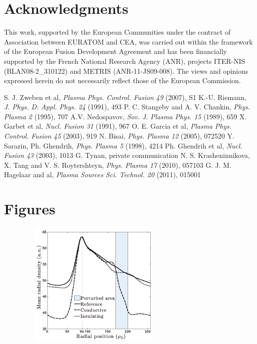 \documentclass[a4paper,12pt]{article} %
\begin{document}
\section*{Acknowledgments}
This work, supported by the European Communities under the contract of
Association between EURATOM and CEA, was carried out within the
framework of the European Fusion Development Agreement and has been financially supported by the French National Research 
Agency (ANR), projects ITER-NIS (BLAN08-2\_310122) and METRIS (ANR-11-JS09-008). The views and
opinions expressed herein do not necessarily reflect those of the
European Commission.
\newpage

\begin{thebibliography}{1}

 S. J. Zweben et al, {\em Plasma Phys. Control. Fusion 49} (2007), S1
 K.-U. Riemann, {\em J. Phys. D: Appl. Phys. 24} (1991), 493
 P. C. Stangeby and A. V. Chankin, {\em Phys. Plasma 2} (1995), 707
 A.V. Nedospavov, {\em Sov. J. Plasma Phys. 15} (1989), 659
 X. Garbet et al, {\em Nucl. Fusion 31} (1991), 967
 O. E. Garcia et al, {\em Plasma Phys. Control. Fusion 45} (2003), 919
 N. Bisai, {\em Phys. Plasma 12} (2005), 072520
 Y. Sarazin, Ph. Ghendrih, {\em Phys. Plasma 5} (1998), 4214
 Ph. Ghendrih et al, {\em Nucl. Fusion 43} (2003), 1013
 G. Tynan, private communication
 N. S. Krasheninnikova, X. Tang and V. S. Roytershteyn, {\em Phys. Plasma 17} (2010), 057103
 G. J. M. Hagelaar and al, {\em Plasma Sources Sci. Technol. 20} (2011), 015001

\end{thebibliography}
\newpage

\listoffigures
\newpage
\thispagestyle{empty}

\section*{Figures}
\center
\begin{figure}[h!]
\center
\caption[Comparison of mean radial profile of SOL density. 
		$\nabla \bar{n}$ is locally impacted around the location of the stripe where the sheath 
		conductivity was changed.]{}
\includegraphics[height=60mm,width=75mm]{figures/FigurePSI2012_1_P1-50_Futtersack.png}
\label{profileN}
\end{figure}
\end{document}
